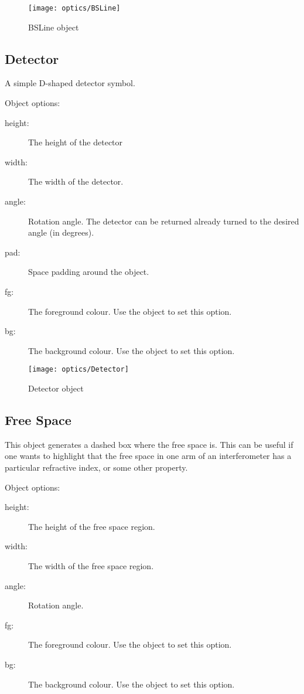 \begin{figure}[ht]
\centerline{\texttt{[image: optics/BSLine]}}
\caption{BSLine object}
\label{fig:bsline}
\end{figure}

\subsection{Detector}

A simple D-shaped detector symbol.

Object options:
\begin{description}
\item[height:] The height of the detector
\item[width:] The width of the detector.
\item[angle:] Rotation angle.  The detector can be returned already
turned to the desired angle (in degrees).
\item[pad:] Space padding around the object.
\item[fg:] The foreground colour.  Use the  object to set this
option.
\item[bg:] The background colour.  Use the  object to set this
option.
\end{description}

\begin{figure}[ht]
\centerline{\texttt{[image: optics/Detector]}}
\caption{Detector object}
\label{fig:detector}
\end{figure}

\subsection{Free Space}

This object generates a dashed box where the free space is.  This can be
useful if one wants to highlight that the free space in one arm of an
interferometer has a particular refractive index, or some other property.

Object options:
\begin{description}
\item[height:] The height of the free space region.
\item[width:] The width of the free space region.
\item[angle:] Rotation angle.  
\item[fg:] The foreground colour.  Use the  object to set this
option.
\item[bg:] The background colour.  Use the  object to set this
option.
\end{description}

